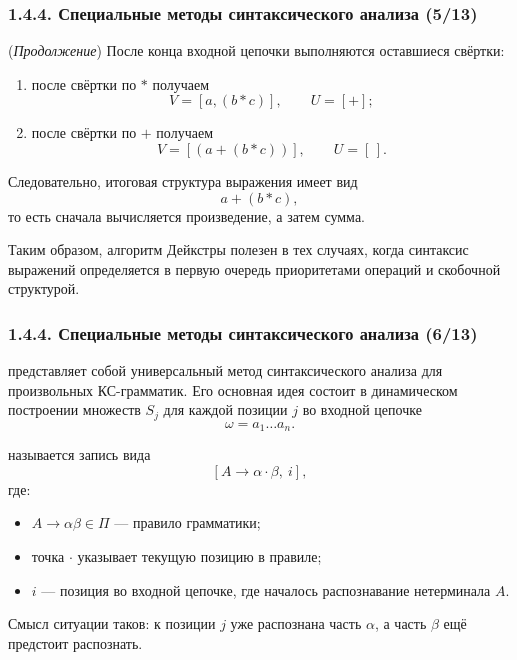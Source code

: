 \begin{frame}
\frametitle{1.4.4. Специальные методы синтаксического анализа (5/13)}

\begin{example}
(\textit{Продолжение})
После конца входной цепочки выполняются оставшиеся свёртки:
\begin{enumerate}
    \item после свёртки по $*$ получаем
    \[
    V=[a,(b*c)],\qquad U=[+];
    \]
    \item после свёртки по $+$ получаем
    \[
    V=[(a+(b*c))],\qquad U=[\,].
    \]
\end{enumerate}

Следовательно, итоговая структура выражения имеет вид
\[
a+(b*c),
\]
то есть сначала вычисляется произведение, а затем сумма.
\end{example}

\begin{remark}
Таким образом, алгоритм Дейкстры полезен в тех случаях, когда синтаксис выражений
определяется в первую очередь приоритетами операций и скобочной структурой.
\end{remark}
\end{frame}

\begin{frame}
\frametitle{1.4.4. Специальные методы синтаксического анализа (6/13)}

 представляет собой универсальный метод
синтаксического анализа для произвольных КС-грамматик. Его основная идея состоит
в динамическом построении множеств  $S_j$
для каждой позиции $j$ во входной цепочке
\[
\omega=a_1\dots a_n.
\]

 называется запись вида
\[
[A \to \alpha \cdot \beta,\ i],
\]
где:
\begin{itemize}
    \item $A \to \alpha\beta \in \Pi$ --- правило грамматики;
    \item точка $\cdot$ указывает текущую позицию в правиле;
    \item $i$ --- позиция во входной цепочке, где началось распознавание
    нетерминала $A$.
\end{itemize}

Смысл ситуации таков: к позиции $j$ уже распознана часть $\alpha$, а часть $\beta$
ещё предстоит распознать.
\end{frame}

